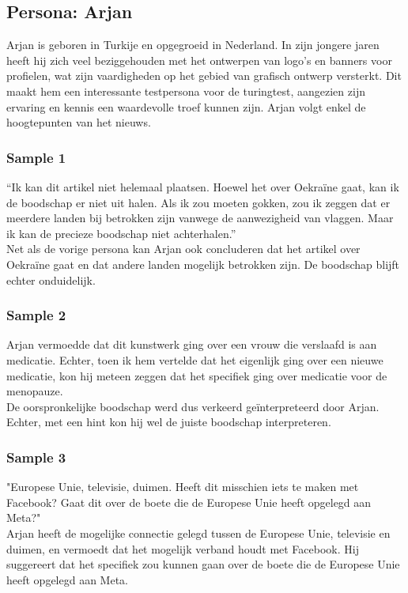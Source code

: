 \subsection{Persona: Arjan}
Arjan is geboren in Turkije en opgegroeid in Nederland. In zijn jongere jaren heeft hij zich veel beziggehouden met het ontwerpen van logo's en banners voor profielen, wat zijn vaardigheden op het gebied van grafisch ontwerp versterkt. Dit maakt hem een interessante testpersona voor de turingtest, aangezien zijn ervaring en kennis een waardevolle troef kunnen zijn. Arjan volgt enkel de hoogtepunten van het nieuws.

\subsubsection{Sample 1}
``Ik kan dit artikel niet helemaal plaatsen. Hoewel het over Oekraïne gaat, kan ik de boodschap er niet uit halen. Als ik zou moeten gokken, zou ik zeggen dat er meerdere landen bij betrokken zijn vanwege de aanwezigheid van vlaggen. Maar ik kan de precieze boodschap niet achterhalen.'' \\

Net als de vorige persona kan Arjan ook concluderen dat het artikel over Oekraïne gaat en dat andere landen mogelijk betrokken zijn. De boodschap blijft echter onduidelijk.

\subsubsection{Sample 2}
Arjan vermoedde dat dit kunstwerk ging over een vrouw die verslaafd is aan medicatie. Echter, toen ik hem vertelde dat het eigenlijk ging over een nieuwe medicatie, kon hij meteen zeggen dat het specifiek ging over medicatie voor de menopauze. \\

De oorspronkelijke boodschap werd dus verkeerd geïnterpreteerd door Arjan. Echter, met een hint kon hij wel de juiste boodschap interpreteren.

\subsubsection{Sample 3}
"Europese Unie, televisie, duimen. Heeft dit misschien iets te maken met Facebook? Gaat dit over de boete die de Europese Unie heeft opgelegd aan Meta?" \\

Arjan heeft de mogelijke connectie gelegd tussen de Europese Unie, televisie en duimen, en vermoedt dat het mogelijk verband houdt met Facebook. Hij suggereert dat het specifiek zou kunnen gaan over de boete die de Europese Unie heeft opgelegd aan Meta. \\

